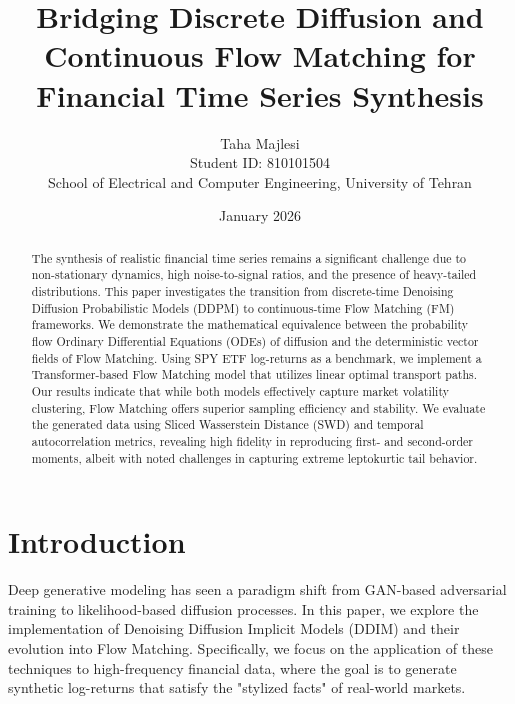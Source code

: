 \documentclass[a4paper,12pt]{article}
\title{\large \textbf{Bridging Discrete Diffusion and Continuous Flow Matching for Financial Time Series Synthesis}}
\author{Taha Majlesi \\ \small Student ID: 810101504 \\ \small School of Electrical and Computer Engineering, University of Tehran}
\date{\small January 2026}
\begin{document}
\maketitle

\begin{abstract}
The synthesis of realistic financial time series remains a significant challenge due to non-stationary dynamics, high noise-to-signal ratios, and the presence of heavy-tailed distributions. This paper investigates the transition from discrete-time Denoising Diffusion Probabilistic Models (DDPM) to continuous-time Flow Matching (FM) frameworks. We demonstrate the mathematical equivalence between the probability flow Ordinary Differential Equations (ODEs) of diffusion and the deterministic vector fields of Flow Matching. Using SPY ETF log-returns as a benchmark, we implement a Transformer-based Flow Matching model that utilizes linear optimal transport paths. Our results indicate that while both models effectively capture market volatility clustering, Flow Matching offers superior sampling efficiency and stability. We evaluate the generated data using Sliced Wasserstein Distance (SWD) and temporal autocorrelation metrics, revealing high fidelity in reproducing first- and second-order moments, albeit with noted challenges in capturing extreme leptokurtic tail behavior.
\end{abstract}
\newpage



\tableofcontents %





\newpage

\section{Introduction}
Deep generative modeling has seen a paradigm shift from GAN-based adversarial training to likelihood-based diffusion processes. In this paper, we explore the implementation of Denoising Diffusion Implicit Models (DDIM) and their evolution into Flow Matching. Specifically, we focus on the application of these techniques to high-frequency financial data, where the goal is to generate synthetic log-returns that satisfy the "stylized facts" of real-world markets.

\end{document}
